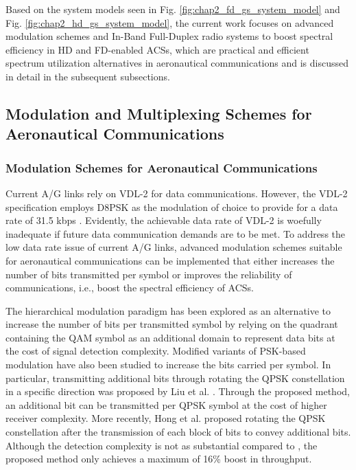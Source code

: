 Based on the system models seen in Fig. \ref{fig:chap2_fd_gs_system_model} and Fig. \ref{fig:chap2_hd_gs_system_model}, the current work focuses on advanced modulation schemes and In-Band Full-Duplex radio systems to boost spectral efficiency in HD and FD-enabled ACSs, which are practical and efficient spectrum utilization alternatives in aeronautical communications and is discussed in detail in the subsequent subsections.

\subsection{Modulation and Multiplexing Schemes for Aeronautical Communications}
\subsubsection{Modulation Schemes for Aeronautical Communications} 
Current A/G links rely on VDL-2 for data communications. However, the VDL-2 specification employs D8PSK as the modulation of choice to provide for a data rate of 31.5 kbps \cite{stacey2008aeronautical}. Evidently, the achievable data rate of VDL-2 is woefully inadequate if future data communication demands are to be met. To address the low data rate issue of current A/G links, advanced modulation schemes suitable for aeronautical communications can be implemented that either increases the number of bits transmitted per symbol or improves the reliability of communications, i.e., boost the spectral efficiency of ACSs. 

The hierarchical modulation paradigm has been explored as an alternative to increase the number of bits per transmitted symbol by relying on the quadrant containing the QAM symbol as an additional domain to represent data bits \cite{jiang2005hierarchical,bae2008research} at the cost of signal detection complexity. Modified variants of PSK-based modulation have also been studied to increase the bits carried per symbol. In particular, transmitting additional bits through rotating the QPSK constellation in a specific direction was proposed by Liu et al. \cite{liu1992rotative}. Through the proposed method, an additional bit can be transmitted per QPSK symbol at the cost of higher receiver complexity. More recently, Hong et al. \cite{hong2015additional} proposed rotating the QPSK constellation after the transmission of each block of bits to convey additional bits. Although the detection complexity is not as substantial compared to \cite{liu1992rotative}, the proposed method only achieves a maximum of 16\% boost in throughput.

